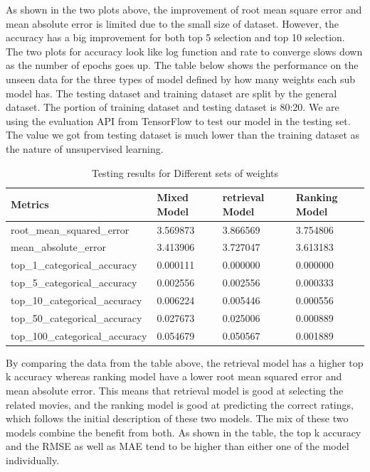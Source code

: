 \documentclass[11pt]{article}
\begin{document}
As shown in the two plots above, the improvement of root mean square error and mean absolute error is limited due to the small size of dataset. However, the accuracy has a big improvement for both top 5 selection and top 10 selection. The two plots for accuracy look like log function and rate to converge slows down as the number of epochs goes up. The table below shows the performance on the unseen data for the three types of model defined by how many weights each sub model has. The testing dataset and training dataset are split by the general dataset. The portion of training dataset and testing dataset is 80:20. We are using the evaluation API from TensorFlow to test our model in the testing set. The value we got from testing dataset is much lower than the training dataset as the nature of unsupervised learning. 

\begin{table}[H]
\centering
\begin{tabular}{|l|l|l|l|} 
\hline
Metrics                         & Mixed Model & retrieval Model & Ranking Model \\ 
\hline
root\_mean\_squared\_error      & 3.569873    & 3.866569        & 3.754806      \\ 
\hline
mean\_absolute\_error           & 3.413906    & 3.727047        & 3.613183      \\ 
\hline
top\_1\_categorical\_accuracy   & 0.000111    & 0.000000        & 0.000000      \\ 
\hline
top\_5\_categorical\_accuracy   & 0.002556    & 0.002556        & 0.000333      \\ 
\hline
top\_10\_categorical\_accuracy  & 0.006224    & 0.005446        & 0.000556      \\ 
\hline
top\_50\_categorical\_accuracy  & 0.027673    & 0.025006        & 0.000889      \\ 
\hline
top\_100\_categorical\_accuracy & 0.054679    & 0.050567        & 0.001889      \\
\hline
\end{tabular}
\caption{Testing results for Different sets of weights}
\end{table}

By comparing the data from the table above, the retrieval model has a higher top k accuracy whereas ranking model have a lower root mean squared error and mean absolute error. This means that retrieval model is good at selecting the related movies, and the ranking model is good at predicting the correct ratings, which follows the initial description of these two models. The mix of these two models combine the benefit from both. As shown in the table, the top k accuracy and the RMSE as well as MAE tend to be higher than either one of the model individually. 
\end{document}
